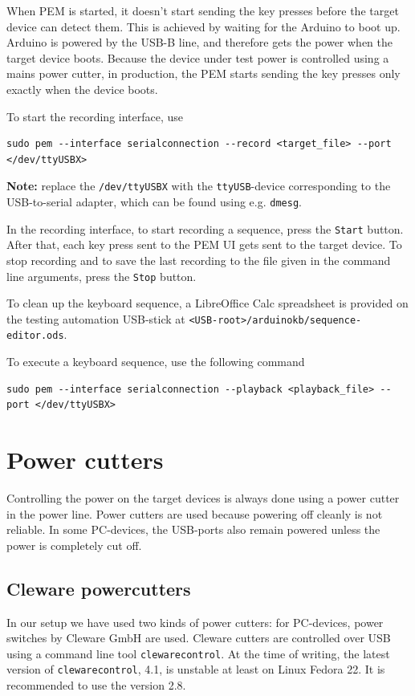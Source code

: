 \documentclass[a4paper,11pt]{article}
\newcommand{\note}{\textbf{Note: }}
\newcommand{\cmd}[1]{\texttt{#1}}
\begin{document}
When PEM is started, it doesn't start sending the key presses before the target device can detect them. This is achieved by waiting for the Arduino to boot up. Arduino is powered by the USB-B line, and therefore gets the power when the target device boots. Because the device under test power is controlled using a mains power cutter, in production, the PEM starts sending the key presses only exactly when the device boots.

To start the recording interface, use
\begin{lstlisting}
sudo pem --interface serialconnection --record <target_file> --port </dev/ttyUSBX>
\end{lstlisting}
\note replace the \cmd{/dev/ttyUSBX} with the \cmd{ttyUSB}-device corresponding to the USB-to-serial adapter, which can be found using e.g. \cmd{dmesg}.

In the recording interface, to start recording a sequence, press the \cmd{Start} button. After that, each key press sent to the PEM UI gets sent to the target device. To stop recording and to save the last recording to the file given in the command line arguments, press the  \cmd{Stop} button.

To clean up the keyboard sequence, a LibreOffice Calc spreadsheet is provided on the testing automation USB-stick at \cmd{<USB-root>/arduinokb/sequence-editor.ods}.

To execute a keyboard sequence, use the following command
\begin{lstlisting}
sudo pem --interface serialconnection --playback <playback_file> --port </dev/ttyUSBX>
\end{lstlisting}

\section{Power cutters}
\label{powercutters}
Controlling the power on the target devices is always done using a power cutter in the power line. Power cutters are used because powering off cleanly is not reliable. In some PC-devices, the USB-ports also remain powered unless the power is completely cut off.

\subsection{Cleware powercutters}
\label{clewarecutters}
In our setup we have used two kinds of power cutters: for PC-devices, power switches by Cleware GmbH are used. Cleware cutters are controlled over USB using a command line tool \cmd{clewarecontrol}. At the time of writing, the latest version of \cmd{clewarecontrol}, 4.1, is unstable at least on Linux Fedora 22. It is recommended to use the version 2.8.
\end{document}
